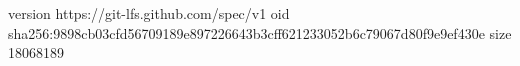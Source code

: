 version https://git-lfs.github.com/spec/v1
oid sha256:9898cb03cfd56709189e897226643b3cff621233052b6c79067d80f9e9ef430e
size 18068189
